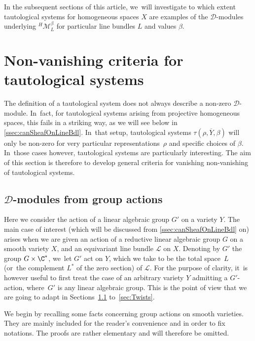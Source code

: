 In the subsequent sections of this article, we~will investigate to which extent tautological systems for homogeneous spaces $X$ are examples of the $\mathscr D$\nobreakdash-mod\-ules underlying ${}^{H\!}\mathcal M_L^\beta$ for particular line bundles $L$ and values $\beta$.

\section{Non-vanishing criteria for tautological systems} \label{sec:nonVanishingCriteria}

The definition of a tautological system does not always describe a non-zero $\mathscr D$\nobreakdash-mod\-ule. In~fact, for tautological systems arising from projective homogeneous spaces, this fails in a striking way, as we will see below in \cref{ssec:canSheafOnLineBdl}. In~that setup, tautological systems $\tau(\rho,\overline{Y},\beta)$ will only be non-zero for very particular representations~$\rho$ and specific choices of $\beta$. In~those cases however, tautological systems are particularly interesting.
The aim of this section is therefore to develop general criteria for vanishing \resp non-vanishing of tautological systems.

\subsection{\texorpdfstring{$\mathscr D$}{D}-modules from group actions} \label{ssec:VFfromGroupActions}

Here we consider the action of a linear algebraic group $G'$ on a variety $Y$.
The main case of interest (which will be discussed from \cref{ssec:canSheafOnLineBdl} on)
arises when we are given an action of a reductive linear algebraic group $G$ on a smooth variety $X$, and an equivariant line bundle $\mathscr{L}$ on $X$. Denoting by $G'$ the group $G \times \C^*$, we~let $G'$ act on $Y$, which we take to be the total space~$L$ (or~the complement $L^*$ of the zero section) of $\mathscr{L}$. For the purpose of clarity, it~is however useful to first treat the case of an arbitrary variety $Y$ admitting a $G'$-action, where~$G'$ is any linear algebraic group. This is the point of view that we are going to adapt in Sections~\ref{ssec:VFfromGroupActions} to~\ref{sec:Twists}.

We begin by recalling some facts concerning group actions on smooth varieties. They are mainly included for the reader's convenience and in order to fix notations. The proofs are rather elementary and will therefore be omitted.

